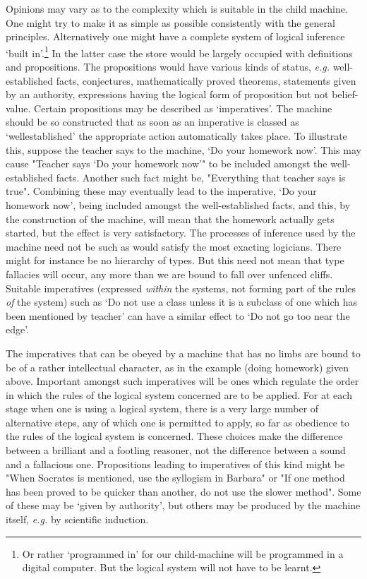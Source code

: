 \documentclass[12pt]{article}
\begin{document}
    Opinions may vary as to the complexity which is suitable in the child machine. One might try to make it as simple as possible consistently with the general principles. Alternatively one might have a complete system of logical inference ‘built in'.\footnote[1]{Or rather ‘programmed in' for our child-machine will be programmed in a digital computer. But the logical system will not have to be learnt.} In the latter case the store would be largely occupied with definitions and propositions. The propositions would have various kinds of status, \textit{e.g.} well-established facts, conjectures, mathematically proved theorems, statements given by an authority, expressions having the logical form of proposition but not belief-value. Certain propositions may be described as ‘imperatives'. The machine should be so constructed that as soon as an imperative is classed as ‘wellestablished' the appropriate action automatically takes place. To illustrate this, suppose the teacher says to the machine, ‘Do your homework now'. This may cause "Teacher says ‘Do your homework now'" to be included amongst the well-established facts. Another such fact might be, "Everything that teacher says is true". Combining these may eventually lead to the imperative, ‘Do your homework now', being included amongst the well-established facts, and this, by the construction of the machine, will mean that the homework actually gets started, but the effect is very satisfactory. The processes of inference used by the machine need not be such as would satisfy the most exacting logicians. There might for instance be no hierarchy of types. But this need not mean that type fallacies will occur, any more than we are bound to fall over unfenced cliffs. Suitable imperatives (expressed \textit{within} the systems, not forming part of the rules \textit{of} the system) such as ‘Do not use a class unless it is a subclass of one which has been mentioned by teacher' can have a similar effect to ‘Do not go too near the edge'.

    The imperatives that can be obeyed by a machine that has no limbs are bound to be of a rather intellectual character, as in the example (doing homework) given above. Important amongst such imperatives will be ones which regulate the order in which the rules of the logical system concerned are to be applied. For at each stage when one is using a logical system, there is a very large number of alternative steps, any of which one is permitted to apply, so far as obedience to the rules of the logical system is concerned. These choices make the difference between a brilliant and a footling reasoner, not the difference between a sound and a fallacious one. Propositions leading to imperatives of this kind might be "When Socrates is mentioned, use the syllogism in Barbara" or "If one method has been proved to be quicker than another, do not use the slower method". Some of these may be ‘given by authority', but others may be produced by the machine itself, \textit{e.g.} by scientific induction.
\end{document}
